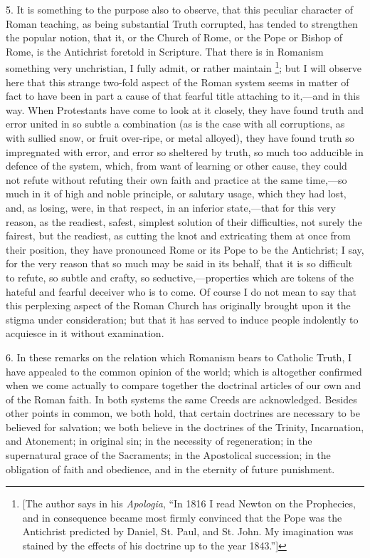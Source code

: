 5. It is something to the purpose also to observe, that this
peculiar character of Roman teaching, as being substantial Truth
corrupted, has tended to strengthen the popular notion, that it, or
the Church of Rome, or the Pope or Bishop of Rome, is the Antichrist
foretold in Scripture. That there is in Romanism something very
unchristian, I fully admit, or rather maintain \footnote{[The author says in his \emph{Apologia},
``In 1816 I read Newton on the Prophecies, and in consequence
became most firmly convinced that the Pope was the Antichrist
predicted by Daniel, St. Paul, and St. John. My imagination was
stained by the effects of his doctrine up to the year 1843.'']}; but I will observe here that this strange two-fold aspect of
the Roman system seems in matter of fact to have been in part a cause
of that fearful title attaching to it,—and in this way. When
Protestants have come to look at it closely, they have found truth and
error united in so subtle a combination (as is the case with all
corruptions, as with sullied snow, or fruit over-ripe, or metal
alloyed), they have found truth so impregnated with error, and error
so sheltered by truth, so much too adducible in defence of the system,
which, from want of learning or other cause, they could not refute
without refuting their own faith and practice at the same time,—so
much in it of high and noble principle, or salutary usage, which they
had lost, and, as losing, were, in that respect, in an inferior state,—that
for this very reason, as the readiest, safest, simplest solution of their difficulties, not surely the fairest, but the readiest, as
cutting the knot and extricating them at once from their position,
they have pronounced Rome or its Pope to be the Antichrist; I say, for
the very reason that so much may be said in its behalf, that it is so
difficult to refute, so subtle and crafty, so seductive,—properties
which are tokens of the hateful and fearful deceiver who is to come.
Of course I do not mean to say that this perplexing aspect of the
Roman Church has originally brought upon it the stigma under
consideration; but that it has served to induce people indolently to
acquiesce in it without examination.

6. In these remarks on the relation which Romanism bears to
Catholic Truth, I have appealed to the common opinion of the world;
which is altogether confirmed when we come actually to compare
together the doctrinal articles of our own and of the Roman faith. In
both systems the same Creeds are acknowledged. Besides other points in
common, we both hold, that certain doctrines are necessary to be
believed for salvation; we both believe in the doctrines of the
Trinity, Incarnation, and Atonement; in original sin; in the necessity
of regeneration; in the supernatural grace of the Sacraments; in the
Apostolical succession; in the obligation of faith and obedience, and
in the eternity of future punishment.

